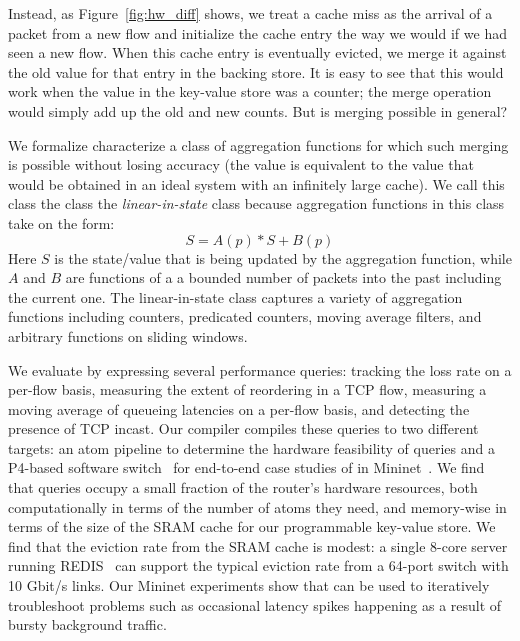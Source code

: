 Instead, as Figure~\ref{fig:hw_diff} shows, we treat a cache miss as the
arrival of a packet from a new flow and initialize the cache entry the way we
would if we had seen a new flow. When this cache entry is eventually evicted,
we merge it against the old value for that entry in the backing store. It is
easy to see that this would work when the value in the key-value store was a
counter; the merge operation would simply add up the old and new counts. But is
merging possible in general?

We formalize characterize a class of aggregation functions for which such
merging is possible without losing accuracy (\ie the value is equivalent to the
value that would be obtained in an ideal system with an infinitely large
cache). We call this class the class the {\em linear-in-state} class because
aggregation functions in this class take on the form:
\begin{equation}
S = A(p) * S + B(p)
\end{equation}
Here $S$ is the state/value that is being updated by the aggregation function,
while $A$ and $B$ are functions of a a bounded number of packets into the past
including the current one. The linear-in-state class captures a variety of
aggregation functions including counters, predicated counters, moving average
filters, and arbitrary functions on sliding windows.

 We evaluate \TheSystem by expressing several performance
queries: tracking the loss rate on a per-flow basis, measuring the extent of
reordering in a TCP flow, measuring a moving average of queueing latencies on a
per-flow basis, and detecting the presence of TCP incast. Our \TheSystem
compiler compiles these queries to two different targets: an atom pipeline to
determine the hardware feasibility of \TheSystem queries and a P4-based
software switch~\cite{p4_behavioral} for end-to-end case studies of \TheSystem
in Mininet~\cite{mininet}. We find that \TheSystem queries occupy a small
fraction of the router's hardware resources, both computationally in terms of
the number of atoms they need, and memory-wise in terms of the size of the SRAM
cache for our programmable key-value store. We find that the eviction rate from
the SRAM cache is modest: a single 8-core server running REDIS~\cite{redis} can
support the typical eviction rate from a 64-port switch with 10 Gbit/s links.
Our Mininet experiments show that \TheSystem can be used to iteratively
troubleshoot problems such as occasional latency spikes happening as a result
of bursty background traffic.

